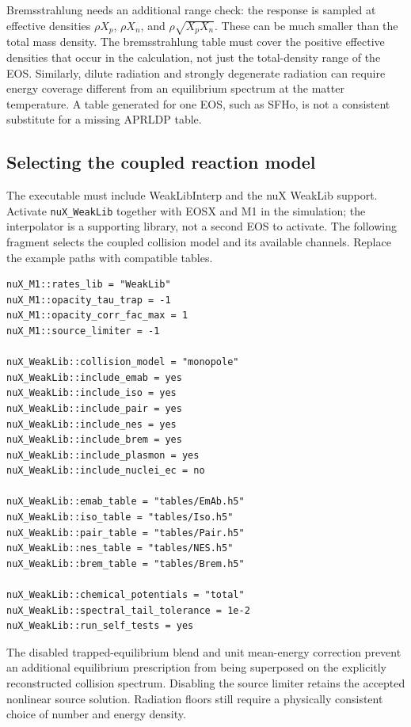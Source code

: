 \documentclass[aps,prd,reprint,nofootinbib,notitlepage]{revtex4-2}
\begin{document}
Bremsstrahlung needs an additional range check: the response is sampled
at effective densities $\rho X_p$, $\rho X_n$, and
$\rho\sqrt{X_pX_n}$. These can be much smaller than the total mass density.
The bremsstrahlung table must cover the positive effective densities that
occur in the calculation, not just the total-density range of the EOS.
Similarly, dilute radiation and strongly degenerate radiation can require
energy coverage different from an equilibrium spectrum at the matter
temperature. A table generated for one EOS, such as SFHo, is not a
consistent substitute for a missing APRLDP table.

\subsection{Selecting the coupled reaction model}

The executable must include WeakLibInterp and the nuX WeakLib support.
Activate \texttt{nuX\_WeakLib} together with EOSX and M1 in the simulation;
the interpolator is a supporting library, not a second EOS to activate.
The following fragment selects the coupled collision model and its
available channels. Replace the example paths with compatible tables.

\begingroup\footnotesize
\begin{verbatim}
nuX_M1::rates_lib = "WeakLib"
nuX_M1::opacity_tau_trap = -1
nuX_M1::opacity_corr_fac_max = 1
nuX_M1::source_limiter = -1

nuX_WeakLib::collision_model = "monopole"
nuX_WeakLib::include_emab = yes
nuX_WeakLib::include_iso = yes
nuX_WeakLib::include_pair = yes
nuX_WeakLib::include_nes = yes
nuX_WeakLib::include_brem = yes
nuX_WeakLib::include_plasmon = yes
nuX_WeakLib::include_nuclei_ec = no

nuX_WeakLib::emab_table = "tables/EmAb.h5"
nuX_WeakLib::iso_table = "tables/Iso.h5"
nuX_WeakLib::pair_table = "tables/Pair.h5"
nuX_WeakLib::nes_table = "tables/NES.h5"
nuX_WeakLib::brem_table = "tables/Brem.h5"

nuX_WeakLib::chemical_potentials = "total"
nuX_WeakLib::spectral_tail_tolerance = 1e-2
nuX_WeakLib::run_self_tests = yes
\end{verbatim}
\endgroup

The disabled trapped-equilibrium blend and unit mean-energy correction
prevent an additional equilibrium prescription from being superposed on
the explicitly reconstructed collision spectrum. Disabling the source
limiter retains the accepted nonlinear source solution. Radiation floors
still require a physically consistent choice of number and energy density.
\end{document}
